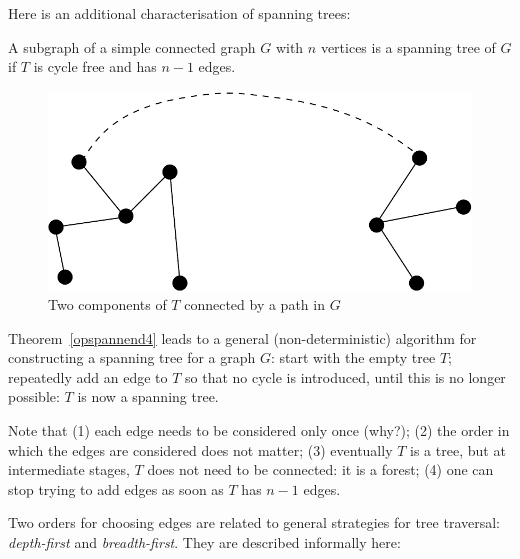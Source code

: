 Here is an additional characterisation of spanning trees:

\begin{lemma}
A subgraph of a simple connected graph $G$ with $n$ vertices is a
spanning tree of $G$ if $T$ is cycle free and has $n-1$ edges.
\end{lemma}

\begin{figure}[ht]
	\centering
	\includegraphics[width=0.3\linewidth,keepaspectratio]{opspannend3}
	\caption{Two components of $T$ connected by a path in $G$
	\label{opspannend3}}
\end{figure}

Theorem~\ref{opspannend4} leads to a general (non-deterministic)
algorithm for constructing a spanning tree for a graph $G$: start with
the empty tree $T$; repeatedly add an edge to $T$ so that no cycle is
introduced, until this is no longer possible: $T$ is now a spanning
tree.

Note that (1) each edge needs to be considered only once (why?); (2)
the order in which the edges are considered does not matter; (3)
eventually $T$ is a tree, but at intermediate stages, $T$ does not
need to be connected: it is a forest; (4) one can stop trying to add
edges as soon as $T$ has $n-1$ edges.

Two orders for choosing edges are related to general strategies for
tree traversal: {\em depth-first} and {\em breadth-first}. They are
described informally here:

